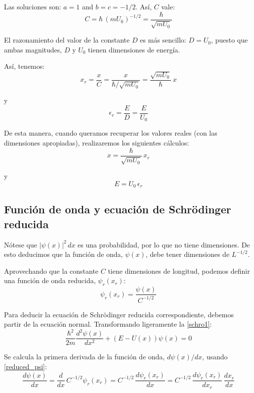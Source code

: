 Las soluciones son: $a=1$ and $b=c=-1/2$. Así, $C$ vale:
\begin{equation}
C = \hbar \,(mU_0)^{-1/2} = \frac{\hbar}{\sqrt{mU_0}}
\end{equation}

El razonamiento del valor de la constante $D$ es más sencillo:
$D=U_0$, puesto que ambas magnitudes, $D$ y $U_0$ tienen dimensiones de
energía.

Así, tenemos:
\begin{equation}
\label{reduced_x2}
x_r = \frac{x}{C}=\frac{x}{\hbar/\sqrt{mU_0}} = \frac{\sqrt{mU_0}}{\hbar}\,x
\end{equation}

y
\begin{equation}
\label{reduced_e2}
\epsilon_r = \frac{E}{D}=\frac{E}{U_0}
\end{equation}

De esta manera, cuando queramos recuperar los valores reales (con las
dimensiones apropiadas), realizaremos los siguientes cálculos:
\[
x = \frac{\hbar}{\sqrt{mU_0}}\,x_r
\]

y
\[
E = U_0\,\epsilon_r
\]

\subsection{Función de onda y ecuación de Schrödinger reducida}
Nótese que $|\psi(x)|^2\,dx$ es una probabilidad, por lo que no tiene
dimensiones. De esto deducimos que la función de onda, $\psi(x)$, debe tener
dimensiones de $L^{-1/2}$.

Aprovechando que la constante $C$ tiene dimensiones de longitud, podemos
definir una función de onda reducida, $\psi_r(x_r)$:
\begin{equation}
\label{reduced_psi}
\psi_r(x_r) = \frac{\psi(x)}{C^{-1/2}}
\end{equation}

Para deducir la ecuación de Schrödinger reducida correspondiente, debemos
partir de la ecuación normal. Transformando ligeramente la \ref{schro1}:
\begin{equation}
\label{schro2}
\frac{\hbar^2}{2m}\frac{d^2\psi(x)}{dx^2} + (E-U(x))\psi(x) = 0
\end{equation}

Se calcula la primera derivada de la función de onda, $d\psi(x)/dx$, 
usando \ref{reduced_psi}:
\[
\frac{d\psi(x)}{dx}
= \frac{d}{dx}\, C^{-1/2}\psi_r(x_r)
= C^{-1/2}\,\frac{d\psi_r(x_r)}{dx}
= C^{-1/2}\,\frac{d\psi_r(x_r)}{dx_r}\,\frac{dx_r}{dx}
\]

